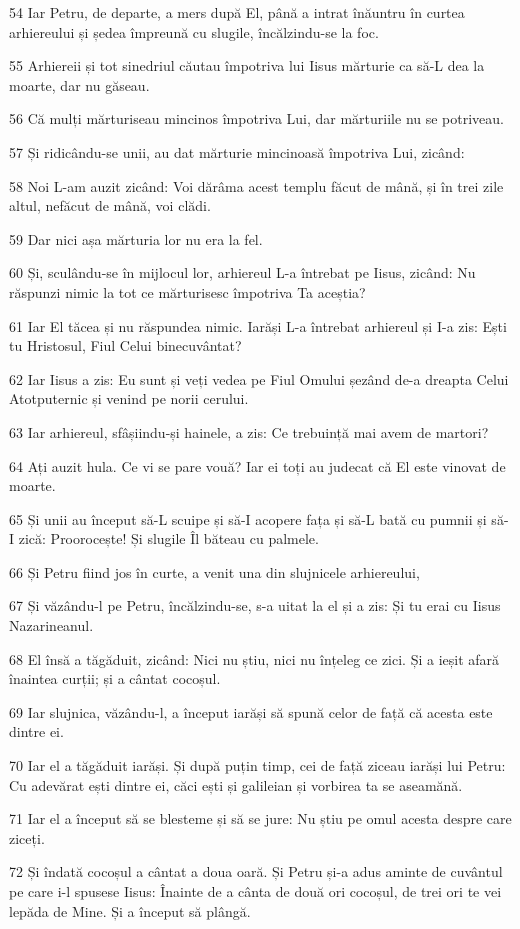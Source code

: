 \par 54 Iar Petru, de departe, a mers după El, până a intrat înăuntru în curtea arhiereului și ședea împreună cu slugile, încălzindu-se la foc.
\par 55 Arhiereii și tot sinedriul căutau împotriva lui Iisus mărturie ca să-L dea la moarte, dar nu găseau.
\par 56 Că mulți mărturiseau mincinos împotriva Lui, dar mărturiile nu se potriveau.
\par 57 Și ridicându-se unii, au dat mărturie mincinoasă împotriva Lui, zicând:
\par 58 Noi L-am auzit zicând: Voi dărâma acest templu făcut de mână, și în trei zile altul, nefăcut de mână, voi clădi.
\par 59 Dar nici așa mărturia lor nu era la fel.
\par 60 Și, sculându-se în mijlocul lor, arhiereul L-a întrebat pe Iisus, zicând: Nu răspunzi nimic la tot ce mărturisesc împotriva Ta aceștia?
\par 61 Iar El tăcea și nu răspundea nimic. Iarăși L-a întrebat arhiereul și I-a zis: Ești tu Hristosul, Fiul Celui binecuvântat?
\par 62 Iar Iisus a zis: Eu sunt și veți vedea pe Fiul Omului șezând de-a dreapta Celui Atotputernic și venind pe norii cerului.
\par 63 Iar arhiereul, sfâșiindu-și hainele, a zis: Ce trebuință mai avem de martori?
\par 64 Ați auzit hula. Ce vi se pare vouă? Iar ei toți au judecat că El este vinovat de moarte.
\par 65 Și unii au început să-L scuipe și să-I acopere fața și să-L bată cu pumnii și să-I zică: Proorocește! Și slugile Îl băteau cu palmele.
\par 66 Și Petru fiind jos în curte, a venit una din slujnicele arhiereului,
\par 67 Și văzându-l pe Petru, încălzindu-se, s-a uitat la el și a zis: Și tu erai cu Iisus Nazarineanul.
\par 68 El însă a tăgăduit, zicând: Nici nu știu, nici nu înțeleg ce zici. Și a ieșit afară înaintea curții; și a cântat cocoșul.
\par 69 Iar slujnica, văzându-l, a început iarăși să spună celor de față că acesta este dintre ei.
\par 70 Iar el a tăgăduit iarăși. Și după puțin timp, cei de față ziceau iarăși lui Petru: Cu adevărat ești dintre ei, căci ești și galileian și vorbirea ta se aseamănă.
\par 71 Iar el a început să se blesteme și să se jure: Nu știu pe omul acesta despre care ziceți.
\par 72 Și îndată cocoșul a cântat a doua oară. Și Petru și-a adus aminte de cuvântul pe care i-l spusese Iisus: Înainte de a cânta de două ori cocoșul, de trei ori te vei lepăda de Mine. Și a început să plângă.


